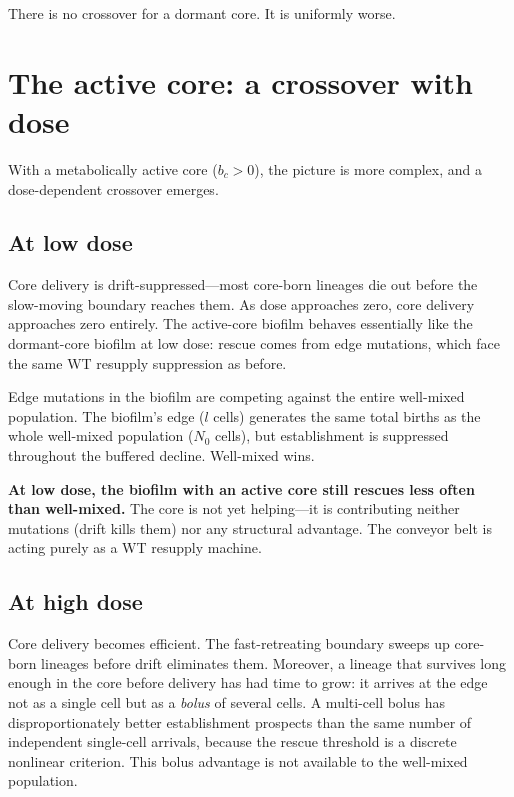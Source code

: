 \documentclass[12pt]{article}
\begin{document}
There is no crossover for a dormant core. It is uniformly worse.

\section{The active core: a crossover with dose}

With a metabolically active core ($b_c > 0$), the picture is more complex,
and a dose-dependent crossover emerges.

\subsection*{At low dose}

Core delivery is drift-suppressed---most core-born lineages die out before
the slow-moving boundary reaches them. As dose approaches zero, core
delivery approaches zero entirely. The active-core biofilm behaves
essentially like the dormant-core biofilm at low dose: rescue comes from
edge mutations, which face the same WT resupply suppression as before.

Edge mutations in the biofilm are competing against the entire well-mixed
population. The biofilm's edge ($l$ cells) generates the same total births
as the whole well-mixed population ($N_0$ cells), but establishment is
suppressed throughout the buffered decline. Well-mixed wins.

\textbf{At low dose, the biofilm with an active core still rescues less
often than well-mixed.} The core is not yet helping---it is contributing
neither mutations (drift kills them) nor any structural advantage. The
conveyor belt is acting purely as a WT resupply machine.

\subsection*{At high dose}

Core delivery becomes efficient. The fast-retreating boundary sweeps up
core-born lineages before drift eliminates them. Moreover, a lineage that
survives long enough in the core before delivery has had time to grow: it
arrives at the edge not as a single cell but as a \emph{bolus} of several
cells. A multi-cell bolus has disproportionately better establishment
prospects than the same number of independent single-cell arrivals, because
the rescue threshold is a discrete nonlinear criterion. This bolus advantage
is not available to the well-mixed population.
\end{document}
